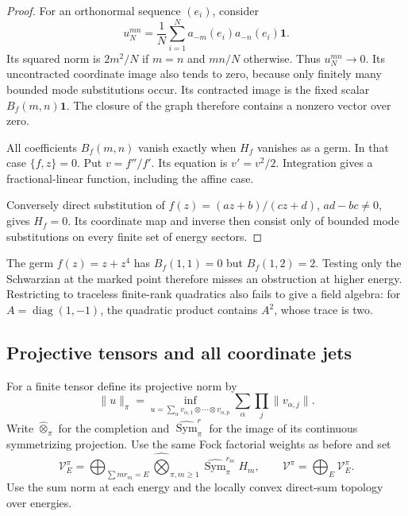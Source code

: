 \begin{proof}
For an orthonormal sequence \((e_i)\), consider
\[
 u_N^{mn}=\frac1N\sum_{i=1}^N
                a_{-m}(e_i)a_{-n}(e_i)\mathbf1.
\]
Its squared norm is \(2m^2/N\) if \(m=n\)
and \(mn/N\) otherwise. Thus \(u_N^{mn}\to0\).
Its uncontracted coordinate image also tends
to zero, because only finitely many bounded
mode substitutions occur. Its contracted
image is the fixed scalar \(B_f(m,n)\mathbf1\).
The closure of the graph therefore contains
a nonzero vector over zero.

All coefficients \(B_f(m,n)\) vanish exactly
when \(H_f\) vanishes as a germ. In that case
\(\{f,z\}=0\). Put \(v=f''/f'\). Its equation
is \(v'=v^2/2\). Integration gives a
fractional-linear function, including the
affine case.

Conversely direct substitution
of \(f(z)=(az+b)/(cz+d)\), \(ad-bc\ne0\),
gives \(H_f=0\). Its coordinate map and inverse
then consist only of bounded mode substitutions
on every finite set of energy sectors.
\end{proof}

The germ \(f(z)=z+z^4\) has
\(B_f(1,1)=0\) but \(B_f(1,2)=2\).
Testing only the Schwarzian at the marked
point therefore misses an obstruction at
higher energy. Restricting to traceless
finite-rank quadratics also fails to give a
field algebra: for \(A=\operatorname{diag}(1,-1)\),
the quadratic product contains \(A^2\), whose
trace is two.

\subsection{Projective tensors and all coordinate jets}

For a finite tensor define its projective norm by
\[
 \|u\|_\pi=
 \inf_{u=\sum_\alpha v_{\alpha,1}\otimes\cdots\otimes v_{\alpha,p}}
       \sum_\alpha\prod_j\|v_{\alpha,j}\|.
\]
Write \(\widehat\otimes_\pi\) for the completion
and \(\widehat{\operatorname{Sym}}_\pi^r\) for
the image of its continuous symmetrizing
projection. Use the same Fock factorial weights
as before and set
\begin{equation}\label{v4-eq:singular-projective-sectors}
 \mathcal V_E^\pi=
 \bigoplus_{\sum m r_m=E}
       \widehat{\bigotimes}_{\pi,m\geq1}
            \widehat{\operatorname{Sym}}_\pi^{r_m}H_m,
 \qquad \mathcal V^\pi=\bigoplus_E\mathcal V_E^\pi.
\end{equation}
Use the sum norm at each energy and the locally
convex direct-sum topology over energies.

